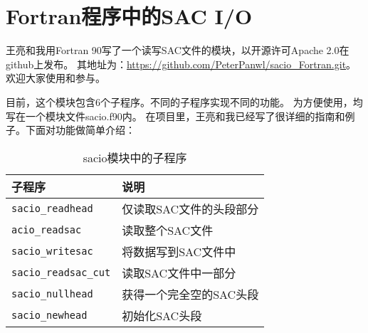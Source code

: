 \section{Fortran程序中的SAC I/O}
王亮和我用Fortran 90写了一个读写SAC文件的模块，以开源许可Apache 2.0在github上发布。
其地址为：\url{https://github.com/PeterPanwl/sacio_Fortran.git}。
欢迎大家使用和参与。

目前，这个模块包含6个子程序。不同的子程序实现不同的功能。
为方便使用，均写在一个模块文件sacio.f90内。
在项目里，王亮和我已经写了很详细的指南和例子。下面对功能做简单介绍：


\begin{table}[H]
\centering
\caption{sacio模块中的子程序}
\label{table:sacio_Fortran}
\begin{tabular}{ll}
\toprule
子程序      &   说明        \\
\midrule
\verb|sacio_readhead|      &   仅读取SAC文件的头段部分 \\
\verb|acio_readsac|          &   读取整个SAC文件 \\
\verb|sacio_writesac|         &   将数据写到SAC文件中 \\
\verb|sacio_readsac_cut|         &   读取SAC文件中一部分 \\
\verb|sacio_nullhead|            &   获得一个完全空的SAC头段\\
\verb|sacio_newhead|            &   初始化SAC头段\\
\bottomrule
\end{tabular}
\end{table}
